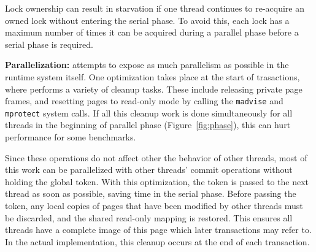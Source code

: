 Lock ownership can result in starvation if one thread continues to re-acquire an owned lock without entering the serial phase.  To avoid this, each lock has a maximum number of times it can be acquired during a parallel phase before a serial phase is required.

\textbf{Parallelization: }
\dthreads{} attempts to expose as much parallelism as possible in the
runtime system itself.  One optimization takes place at the start of trasactions, where
\dthreads{} performs a variety of cleanup tasks. These include releasing private page frames,
and resetting pages to read-only mode by calling the \texttt{madvise}
and \texttt{mprotect} system calls. If all this cleanup work is done
simultaneously for all threads in the beginning of parallel phase
(Figure~\ref{fig:phase}), this can hurt performance for some
benchmarks.

Since these operations do not affect other the behavior of other
threads, most of this work can be parallelized with other threads'
commit operations without holding the global token. With this
optimization, the token is passed to the next thread as soon as
possible, saving time in the serial phase.  Before passing the token,
any local copies of pages that have been modified by other threads
must be discarded, and the shared read-only mapping is restored.  This
ensures all threads have a complete image of this page which later
transactions may refer to.  In the actual
implementation, this cleanup occurs at the end of each transaction.

